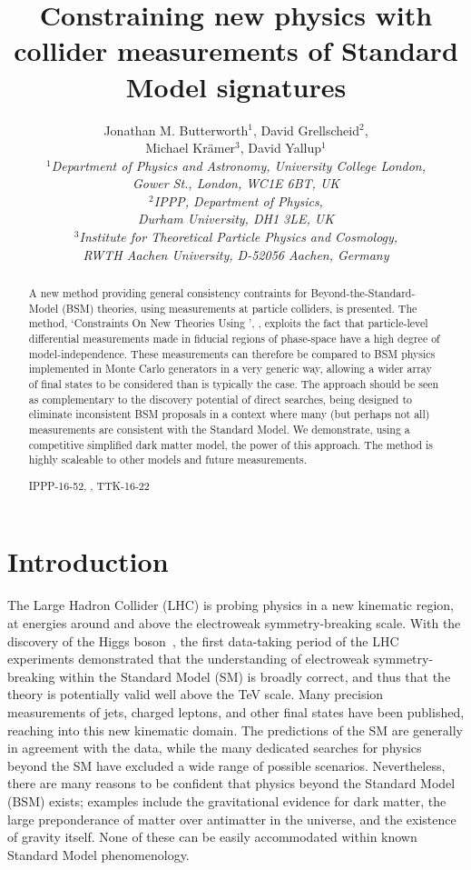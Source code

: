 \documentclass[floatfix]{article}
\title{Constraining new physics with collider measurements of Standard Model signatures}
\author{Jonathan M. Butterworth$^1$, David Grellscheid$^2$,\\[1mm] Michael Kr\"amer$^3$, David Yallup$^1$\\[2.5mm]
\it $^1$Department of Physics and Astronomy, University College London,\\ \it Gower St., London, WC1E 6BT, UK\\[1mm]
\it $^2$IPPP, Department of Physics,\\\it Durham University, DH1 3LE, UK\\[1mm] \it $^3$Institute for Theoretical Particle Physics and Cosmology, \\ \it RWTH Aachen University, D-52056 Aachen, Germany}
\begin{document}
\maketitle 

\begin{abstract}
A new method providing general consistency contraints for Beyond-the-Standard-Model (BSM) theories, using 
measurements at particle colliders, is presented. The method, `Constraints On New Theories Using \rivet', \Contur, exploits 
the fact that particle-level differential measurements made in fiducial regions of phase-space have a high degree of
model-independence. These measurements can therefore be compared to BSM physics implemented in Monte Carlo generators in a very
generic way, allowing a wider array of final states to be considered than is typically the case. The \Contur approach should be seen
as complementary to the discovery potential of direct searches, being designed to eliminate inconsistent 
BSM proposals in a context where many (but perhaps not all) measurements are consistent with the Standard Model.
We demonstrate, using a competitive simplified dark matter model, the power of this approach. 
The \Contur method is highly scaleable to other models and future measurements.
%
\begin{flushright}IPPP-16-52, , TTK-16-22\end{flushright}
\end{abstract}


\section{Introduction}
\label{sec:intro}
The Large Hadron Collider (LHC) is probing physics in a new kinematic region, at energies around and above the 
electroweak symmetry-breaking scale. With the discovery of the Higgs boson~\cite{Aad:2012tfa,Chatrchyan:2012ufa}, 
the first data-taking period of the LHC experiments demonstrated that the understanding of electroweak symmetry-breaking within
the Standard Model (SM) is broadly correct, and thus that the theory is potentially valid well above the
TeV scale. Many precision measurements of jets, charged leptons, and other final states 
have been published, reaching into this new kinematic domain. The predictions of the SM are 
generally in agreement with the data, while the many dedicated searches for physics beyond the SM
have excluded a wide range of possible scenarios. 
Nevertheless, there are many reasons to be confident that
physics beyond the Standard Model (BSM) exists; examples include the gravitational evidence for dark matter, the large 
preponderance of matter over antimatter in the universe, and the existence of gravity itself. None of 
these can be easily accommodated within known Standard Model phenomenology. 
\end{document}
